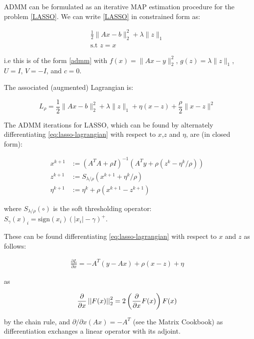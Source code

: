ADMM can be formulated as an iterative MAP estimation procedure for the problem \eqref{LASSO}. We can write \eqref{LASSO} in constrained form as:

\begin{eqnarray}
\frac{1}{2}\|Ax-b\|_2^2 + \lambda\|z\|_1 \\
\text{s.t } z = x
\end{eqnarray}

i.e this is of the form \eqref{admm} with \( f\left(x\right) =\|Ax-y\|_2^2\), \(g\left(z\right) = \lambda\|z\|_1\), \(U=I\), \(V=-I\), and \(c=0\).

The associated (augmented) Lagrangian is:

\begin{equation}
L_\rho = \frac{1}{2}\|Ax-b\|_2^2 + \lambda\|z\|_1 + \eta\left(x-z\right) + \frac{\rho}{2}\|x-z\|^2
\label{eq:lasso-lagrangian}
\end{equation}

The ADMM iterations for LASSO, which can be found by alternately differentiating \eqref{eq:lasso-lagrangian} with respect to \(x\),\(z\) and \(\eta\), are (in closed form):

\begin{align}
x^{k+1} &:= \left(A^TA + \rho I\right)^{-1}\left(A^Ty +\rho\left( z^k - \eta^k/\rho\right)\right)\\
z^{k+1} &:= S_{\lambda/\rho}\left(x^{k+1} + \eta^k/\rho\right)
 \\
\eta^{k+1} &:= \eta^{k} + \rho\left(x^{k+1}-z^{k+1}\right)
\label{admm_algo_lasso}
\end{align}

where \(S_{\lambda/\rho}\left(\circ\right)\) is the soft thresholding operator: \(S_\gamma\left(x\right)_i = \mathrm{sign}(x_i)\left(|x_i| - \gamma\right)^+\).

These can be found differentiating \eqref{eq:lasso-lagrangian} with respect to \(x\) and \(z\) as follows:

\begin{align*}
\frac{\partial L}{\partial x } = -A^T\left(y-Ax\right) + \rho (x-z) + \eta
\end{align*}

as 

\begin{equation}
\frac{\partial}{\partial x} \left|\left|F(x)\right|\right|_2^2 = 2\left(\frac{\partial}{\partial x} F(x)\right) F(x) 
\label{dellx}
\end{equation}

by the chain rule, and \(\partial/\partial x (Ax) = -A^T\) (see the Matrix Cookbook) as differentiation exchanges a linear operator with its adjoint.

